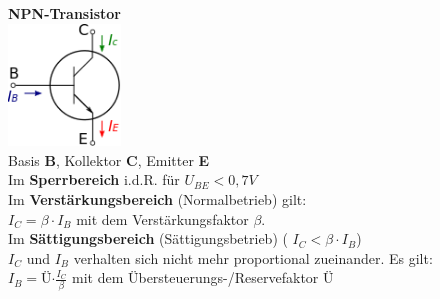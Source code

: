 \documentclass[fs, footer]{latex4ei}
\begin{document}
\begin{multicols*}{4}
{ 	\textbf{NPN-Transistor}\\
	\includegraphics[width = 3cm]{./img/Transistor_npn.png} \\

	Basis \textbf{B}, Kollektor \textbf{C}, Emitter \textbf{E} \\

	Im \textbf{Sperrbereich} i.d.R. für $U_{BE}<0,7V$\\
	
	Im \textbf{Verstärkungsbereich} (Normalbetrieb) gilt:\\
	$I_C = \beta \cdot I_B $ mit dem Verstärkungsfaktor $\beta$.\\

	Im \textbf{Sättigungsbereich} (Sättigungsbetrieb) (	$I_C < \beta \cdot I_B $) \\
	$I_C$ und $I_B$ verhalten sich nicht mehr proportional zueinander. Es gilt:\\
	$ I_B = $Ü$ \cdot \frac{I_C}{\beta} $ mit dem Übersteuerungs-/Reservefaktor Ü \\

	
}


\end{multicols*}
\end{document}

